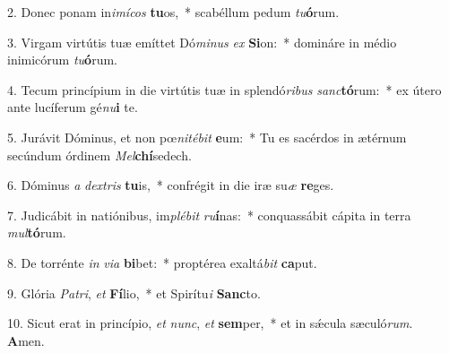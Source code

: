 2. Donec ponam in\textit{i}\textit{mí}\textit{cos} \textbf{tu}os,~*  scabéllum pedum \textit{tu}\textbf{ó}rum.\

3. Virgam virtútis tuæ emíttet Dó\textit{mi}\textit{nus} \textit{ex} \textbf{Si}on:~*  domináre in médio inimicórum \textit{tu}\textbf{ó}rum.\

4. Tecum princípium in die virtútis tuæ in splendó\textit{ri}\textit{bus} \textit{sanc}\textbf{tó}rum:~*  ex útero ante lucíferum gé\textit{nu}\textbf{i} te.\

5. Jurávit Dóminus, et non pœ\textit{ni}\textit{té}\textit{bit} \textbf{e}um:~*  Tu es sacérdos in ætérnum secúndum órdinem \textit{Mel}\textbf{chí}sedech.\

6. Dóminus \textit{a} \textit{dex}\textit{tris} \textbf{tu}is,~*  confrégit in die iræ su\textit{æ} \textbf{re}ges.\

7. Judicábit in natiónibus, im\textit{plé}\textit{bit} \textit{ru}\textbf{í}nas:~*  conquassábit cápita in terra \textit{mul}\textbf{tó}rum.\

8. De torrénte \textit{in} \textit{vi}\textit{a} \textbf{bi}bet:~*  proptérea exaltá\textit{bit} \textbf{ca}put.\

9. Glória \textit{Pa}\textit{tri}, \textit{et} \textbf{Fí}lio,~*  et Spirítu\textit{i} \textbf{Sanc}to.\

10. Sicut erat in princípio, \textit{et} \textit{nunc}, \textit{et} \textbf{sem}per,~*  et in sǽcula sæculó\textit{rum}. \textbf{A}men.\

